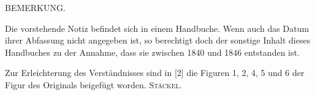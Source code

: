 %
\begin{center}
BEMERKUNG.
\end{center}

Die vorstehende Notiz befindet sich in einem Handbuche. Wenn auch das Datum ihrer Abfassung nicht angegeben ist, so berechtigt doch der sonstige Inhalt dieses Handbuches zu der Annahme, dass sie zwischen 1840 und 1846 entstanden ist.

Zur Erleichterung des Verständnisses sind in [2] die Figuren 1, 2, 4, 5 und 6 der Figur des Originals beigefügt worden. \hfill\textsc{Stäckel}.
